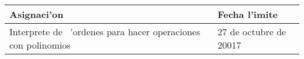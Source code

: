 \documentclass{article}
\begin{document}
\begin{center}
\begin{tabular}{|p{2.0in}|p{2.0in}|}
\hline
{\bf Asignaci'on} & {\bf Fecha l'imite} 		\\ \hline
Interprete de \ 'ordenes para hacer operaciones		con polinomios &
27 de octubre de 20017\\ \hline
\end{tabular}
\end{center}
\end{document}

